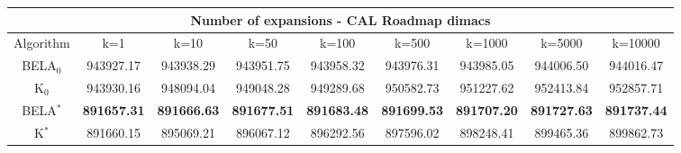 \begin{tabular}{c|cccccccc}\toprule
\multicolumn{9}{c}{Number of expansions - CAL Roadmap dimacs}\\ \midrule
Algorithm & k=1 & k=10 & k=50 & k=100 & k=500 & k=1000 & k=5000 & k=10000 \\ \midrule
BELA$_0$ & 943927.17 & 943938.29 & 943951.75 & 943958.32 & 943976.31 & 943985.05 & 944006.50 & 944016.47 \\
K$_0$ & 943930.16 & 948094.04 & 949048.28 & 949289.68 & 950582.73 & 951227.62 & 952413.84 & 952857.71 \\
BELA$^*$ & \textbf{891657.31} & \textbf{891666.63} & \textbf{891677.51} & \textbf{891683.48} & \textbf{891699.53} & \textbf{891707.20} & \textbf{891727.63} & \textbf{891737.44} \\
K$^*$ & 891660.15 & 895069.21 & 896067.12 & 896292.56 & 897596.02 & 898248.41 & 899465.36 & 899862.73 \\ \bottomrule 
\end{tabular}
